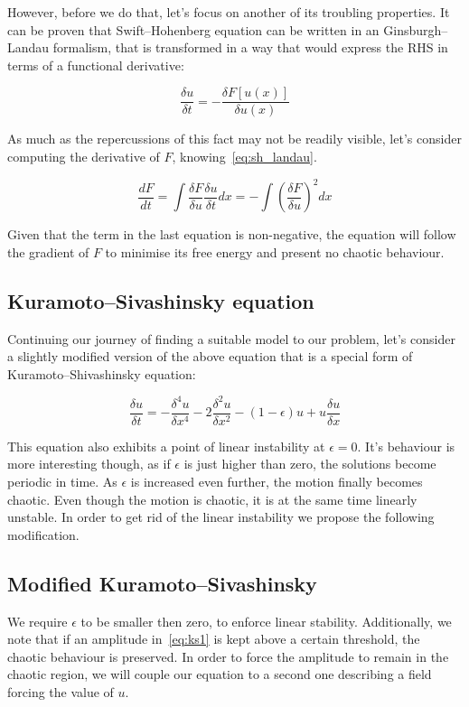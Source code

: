 \documentclass[11pt,a4paper]{article}
\begin{document}
However, before we do that, let's focus on another of its troubling properties.
It can be proven\cite{Schneider96} that Swift--Hohenberg equation can be written in an Ginsburgh--Landau formalism, that is transformed in a way that would express the RHS in terms of a functional derivative:

\begin{equation}\label{eq:sh_landau}
    \frac{\delta u}{\delta t} = - \frac{\delta F[u(x)]}{\delta u(x)}
\end{equation}

As much as the repercussions of this fact may not be readily visible, let's consider computing the derivative of $F$, knowing~\eqref{eq:sh_landau}.

\begin{equation}\label{eq:sh_der}
    \frac{dF}{dt} = \int\frac{\delta F}{\delta u} \frac{\delta u}{\delta t}dx = -\int (\frac{\delta F}{\delta u})^2 dx
\end{equation}

Given that the term in the last equation is non-negative, the equation will follow the gradient of $F$ to minimise its free energy and present no chaotic behaviour.

\subsection{Kuramoto--Sivashinsky equation}
Continuing our journey of finding a suitable model to our problem, let's consider a slightly modified version of the above equation that is a special form of Kuramoto--Shivashinsky\cite{Hayman86} equation:

\begin{equation}\label{eq:ks1}
    \frac{\delta u}{\delta t} = -\frac{\delta^4 u}{\delta x^4} - 2\frac{\delta^2u}{\delta x^2} - (1 - \epsilon)u + u\frac{\delta u}{\delta x}
\end{equation}

This equation also exhibits a point of linear instability at $\epsilon = 0$.
It's behaviour is more interesting though, as if $\epsilon$ is just higher than zero, the solutions become periodic in time.
As $\epsilon$ is increased even further, the motion finally becomes chaotic.
Even though the motion is chaotic, it is at the same time linearly unstable.
In order to get rid of the linear instability we propose the following modification.

\subsection{Modified Kuramoto--Sivashinsky}
We require $\epsilon$ to be smaller then zero, to enforce linear stability.
Additionally, we note that if an amplitude in~\eqref{eq:ks1} is kept above a certain threshold, the chaotic behaviour is preserved.
In order to force the amplitude to remain in the chaotic region, we will couple our equation to a second one describing a field forcing the value of $u$.
\end{document}

